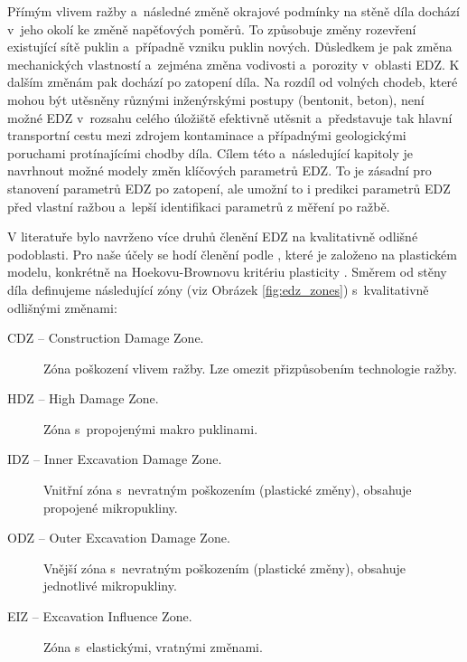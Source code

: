 \documentclass{article}
\begin{document}
Přímým vlivem ražby a~následné změně okrajové podmínky na stěně díla dochází v~jeho okolí ke změně napěťových poměrů. To způsobuje změny rozevření 
existující sítě puklin a~případně vzniku puklin nových. Důsledkem je pak změna mechanických vlastností a~zejména změna vodivosti
a~porozity v~oblasti EDZ. K dalším změnám pak dochází po zatopení díla. Na rozdíl od volných chodeb, které mohou být utěsněny různými inženýrskými postupy (bentonit, beton), není možné EDZ v~rozsahu celého úložiště efektivně utěsnit a~představuje tak hlavní transportní cestu mezi zdrojem kontaminace 
a případnými geologickými poruchami protínajícími chodby díla. 
Cílem této a~následující kapitoly je navrhnout možné modely změn klíčových parametrů EDZ. To je zásadní pro stanovení parametrů EDZ po zatopení, ale
umožní to i predikci parametrů EDZ před vlastní ražbou a~lepší identifikaci parametrů z měření po ražbě.

V literatuře bylo navrženo více druhů členění EDZ na kvalitativně odlišné podoblasti. Pro naše účely se hodí členění podle \cite{Perras2016}, 
které je založeno na plastickém modelu, konkrétně na Hoekovu-Brownovu kritériu plasticity \cite{Hoek2002}. Směrem od stěny díla definujeme následující zóny (viz Obrázek \ref{fig:edz_zones}) s~kvalitativně odlišnými změnami:
\begin{description}
\item[CDZ -- Construction Damage Zone.] Zóna poškození vlivem ražby. Lze omezit přizpůsobením technologie ražby.
\item[HDZ -- High Damage Zone.] Zóna s~propojenými makro puklinami. 
\item[IDZ -- Inner Excavation Damage Zone.] Vnitřní zóna s~nevratným poškozením (plastické změny), obsahuje propojené mikropukliny.
\item[ODZ -- Outer Excavation Damage Zone.] Vnější zóna s~nevratným poškozením (plastické změny), obsahuje jednotlivé mikropukliny.
\item[EIZ -- Excavation Influence Zone.] Zóna s~elastickými, vratnými změnami.
\end{description}
\end{document}
